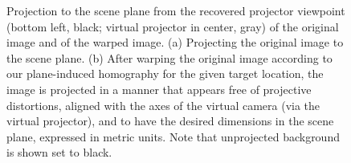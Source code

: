 \documentclass[review]{elsarticle}
\begin{document}
\begin{figure}
    \centering
    \qquad
    \caption{Projection to the scene plane from the recovered projector viewpoint (bottom left, black; virtual projector in center, gray) of the original image and of the warped image. (a) Projecting the original image to the scene plane. (b) After warping the original image according to our plane-induced homography for the given target location, the image is projected in a manner that appears free of projective distortions, aligned with the axes of the virtual camera (via the virtual projector), and to have the desired dimensions in the scene plane, expressed in metric units. Note that unprojected background is shown set to black.}
    \label{fig:warp}
\end{figure}
\end{document}
